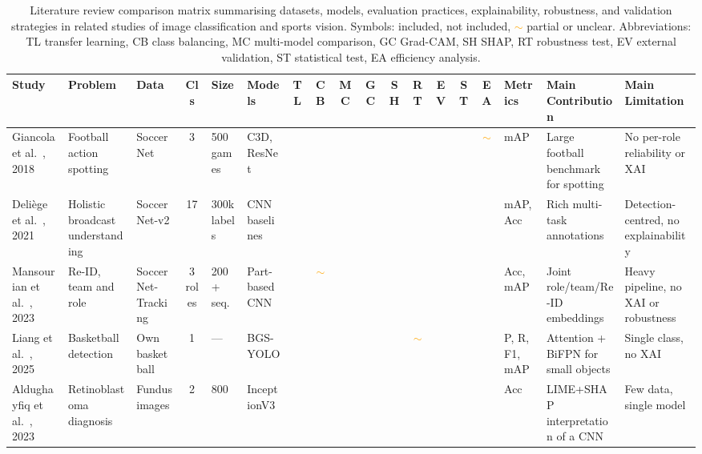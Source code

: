 \documentclass[preprint,12pt]{elsarticle}
\newcommand{\cmark}{\ding{51}} %
\newcommand{\xmark}{\ding{55}} %
\newcommand{\pmark}{\textcolor{orange}{$\sim$}} %
\begin{document}
\begin{table}
\centering
\tiny
\caption{Literature review comparison matrix summarising datasets, models, evaluation practices, explainability, robustness, and validation strategies in related studies of image classification and sports vision. Symbols: \cmark{} included, \xmark{} not included, \pmark{} partial or unclear. Abbreviations: TL transfer learning, CB class balancing, MC multi-model comparison, GC Grad-CAM, SH SHAP, RT robustness test, EV external validation, ST statistical test, EA efficiency analysis.}
\label{tab:literature_matrix}
\begin{tabular}{p{1.6cm} p{1.8cm} p{1.5cm} c p{1.1cm} p{1.7cm} c c c c c c c c c p{1.7cm} p{2.3cm} p{2.3cm}}
\toprule
\textbf{Study} & \textbf{Problem} & \textbf{Data} & \textbf{Cls} & \textbf{Size} & \textbf{Models} & \textbf{TL} & \textbf{CB} & \textbf{MC} & \textbf{GC} & \textbf{SH} & \textbf{RT} & \textbf{EV} & \textbf{ST} & \textbf{EA} & \textbf{Metrics} & \textbf{Main Contribution} & \textbf{Main Limitation} \\
\midrule
Giancola et al.~\cite{giancola2018soccernet}, 2018 & Football action spotting & SoccerNet & 3 & 500 games & C3D, ResNet & \cmark & \xmark & \cmark & \xmark & \xmark & \xmark & \xmark & \xmark & \pmark & mAP & Large football benchmark for spotting & No per-role reliability or XAI \\
Deli\`ege et al.~\cite{deliege2021soccernetv2}, 2021 & Holistic broadcast understanding & SoccerNet-v2 & 17 & 300k labels & CNN baselines & \cmark & \xmark & \cmark & \xmark & \xmark & \xmark & \xmark & \xmark & \xmark & mAP, Acc & Rich multi-task annotations & Detection-centred, no explainability \\
Mansourian et al.~\cite{somers2024multitask}, 2023 & Re-ID, team and role & SoccerNet-Tracking & 3 roles & 200+ seq. & Part-based CNN & \cmark & \pmark & \cmark & \xmark & \xmark & \xmark & \xmark & \xmark & \xmark & Acc, mAP & Joint role/team/Re-ID embeddings & Heavy pipeline, no XAI or robustness \\
Liang et al.~\cite{liang2025basketball}, 2025 & Basketball detection & Own basketball & 1 & --- & BGS-YOLO & \cmark & \xmark & \cmark & \xmark & \xmark & \pmark & \xmark & \cmark & \cmark & P, R, F1, mAP & Attention + BiFPN for small objects & Single class, no XAI \\
Aldughayfiq et al.~\cite{aldughayfiq2023retinoblastoma}, 2023 & Retinoblastoma diagnosis & Fundus images & 2 & 800 & InceptionV3 & \cmark & \xmark & \xmark & \xmark & \cmark & \xmark & \xmark & \xmark & \xmark & Acc & LIME+SHAP interpretation of a CNN & Few data, single model \\

\end{tabular}
\end{table}
\end{document}
